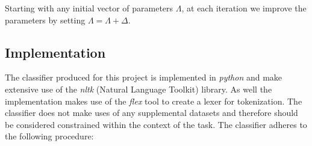 \documentclass[12pt]{article}
\begin{document}
Starting with any initial vector of parameters $\Lambda$, at each iteration
we improve the parameters by setting $\Lambda = \Lambda + \Delta$.


\subsection{Implementation}

The classifier produced for this project is implemented in \textit{python} and
make extensive use of the \textit{nltk} (Natural Language Toolkit) library. As
well the implementation makes use of the \textit{flex} tool to create a lexer
for tokenization. The classifier does not make uses of any supplemental
datasets and therefore should be considered constrained within the context of
the task. The classifier adheres to the following procedure:
\end{document}
